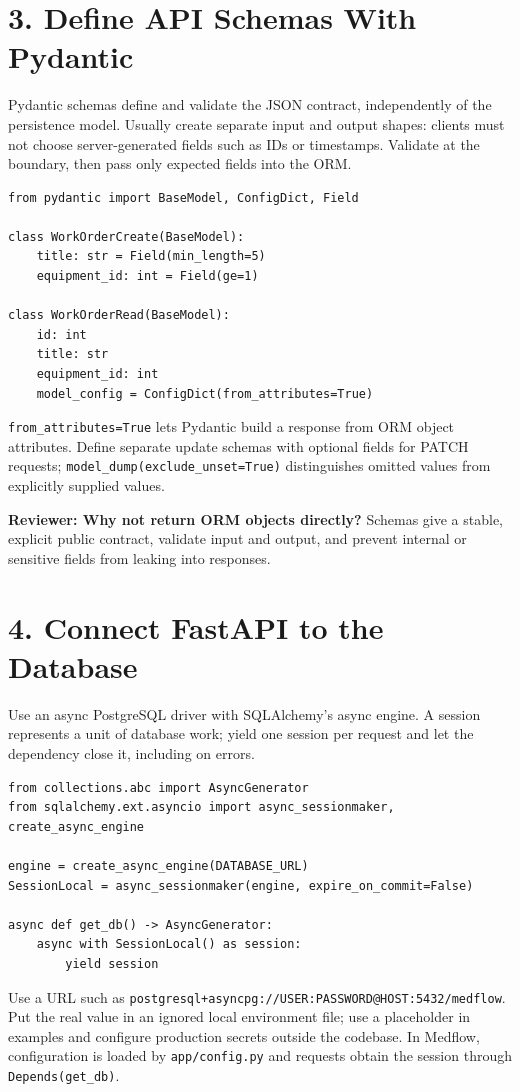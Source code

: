 \documentclass[10pt]{article}
\begin{document}
\section{3. Define API Schemas With Pydantic}
Pydantic schemas define and validate the JSON contract, independently of the persistence model. Usually create separate input and output shapes: clients must not choose server-generated fields such as IDs or timestamps. Validate at the boundary, then pass only expected fields into the ORM.
\begin{lstlisting}
from pydantic import BaseModel, ConfigDict, Field

class WorkOrderCreate(BaseModel):
    title: str = Field(min_length=5)
    equipment_id: int = Field(ge=1)

class WorkOrderRead(BaseModel):
    id: int
    title: str
    equipment_id: int
    model_config = ConfigDict(from_attributes=True)
\end{lstlisting}
\texttt{from\_attributes=True} lets Pydantic build a response from ORM object attributes. Define separate update schemas with optional fields for PATCH requests; \texttt{model\_dump(exclude\_unset=True)} distinguishes omitted values from explicitly supplied values.

\textbf{Reviewer: Why not return ORM objects directly?} Schemas give a stable, explicit public contract, validate input and output, and prevent internal or sensitive fields from leaking into responses.

\section{4. Connect FastAPI to the Database}
Use an async PostgreSQL driver with SQLAlchemy's async engine. A session represents a unit of database work; yield one session per request and let the dependency close it, including on errors.
\begin{lstlisting}
from collections.abc import AsyncGenerator
from sqlalchemy.ext.asyncio import async_sessionmaker, create_async_engine

engine = create_async_engine(DATABASE_URL)
SessionLocal = async_sessionmaker(engine, expire_on_commit=False)

async def get_db() -> AsyncGenerator:
    async with SessionLocal() as session:
        yield session
\end{lstlisting}
Use a URL such as \texttt{postgresql+asyncpg://USER:PASSWORD@HOST:5432/medflow}. Put the real value in an ignored local environment file; use a placeholder in examples and configure production secrets outside the codebase. In Medflow, configuration is loaded by \texttt{app/config.py} and requests obtain the session through \texttt{Depends(get\_db)}.
\end{document}

